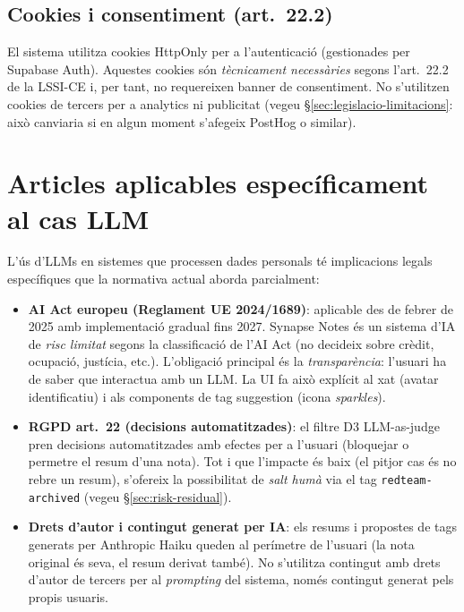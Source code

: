 \subsection{Cookies i consentiment (art.~22.2)}

El sistema utilitza cookies HttpOnly per a l'autenticació (gestionades per Supabase Auth). Aquestes cookies són \emph{tècnicament necessàries} segons l'art.~22.2 de la LSSI-CE i, per tant, no requereixen banner de consentiment. No s'utilitzen cookies de tercers per a analytics ni publicitat (vegeu \S\ref{sec:legislacio-limitacions}: això canviaria si en algun moment s'afegeix PostHog o similar).

\section{Articles aplicables específicament al cas LLM}
\label{sec:articles-specific}

L'ús d'LLMs en sistemes que processen dades personals té implicacions legals específiques que la normativa actual aborda parcialment:

\begin{itemize}
    \item \textbf{AI Act europeu (Reglament UE 2024/1689)}: aplicable des de febrer de 2025 amb implementació gradual fins 2027. Synapse Notes és un sistema d'IA de \emph{risc limitat} segons la classificació de l'AI Act (no decideix sobre crèdit, ocupació, justícia, etc.). L'obligació principal és la \emph{transparència}: l'usuari ha de saber que interactua amb un LLM. La UI fa això explícit al xat (avatar identificatiu) i als components de tag suggestion (icona \emph{sparkles}).
    \item \textbf{RGPD art.~22 (decisions automatitzades)}: el filtre D3 LLM-as-judge pren decisions automatitzades amb efectes per a l'usuari (bloquejar o permetre el resum d'una nota). Tot i que l'impacte és baix (el pitjor cas és no rebre un resum), s'ofereix la possibilitat de \emph{salt humà} via el tag \texttt{redteam-archived} (vegeu \S\ref{sec:risk-residual}).
    \item \textbf{Drets d'autor i contingut generat per IA}: els resums i propostes de tags generats per Anthropic Haiku queden al perímetre de l'usuari (la nota original és seva, el resum derivat també). No s'utilitza contingut amb drets d'autor de tercers per al \emph{prompting} del sistema, només contingut generat pels propis usuaris.
\end{itemize}

